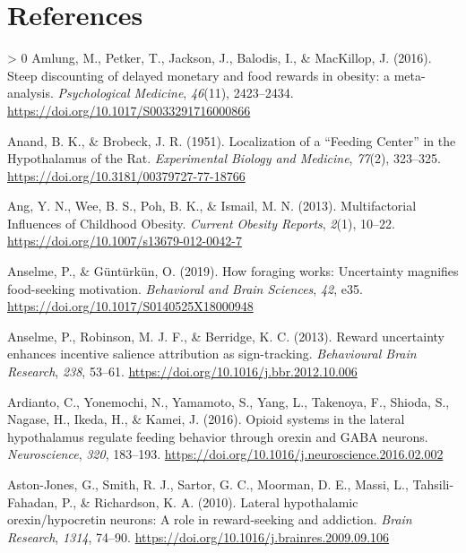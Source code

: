 \documentclass[
]{/home/nicoluarte/Downloads/templates/PNAS-template-main.tex}
\newlength{\cslhangindent}
\newenvironment{CSLReferences}[3] %
 {%
  \setlength{\parindent}{0pt}
  \ifodd #1 \everypar{\setlength{\hangindent}{\cslhangindent}}\ignorespaces\fi
  \ifnum #2 > 0
  \setlength{\parskip}{#2\baselineskip}
  \fi
 }%
 {}
\begin{document}
\newpage

\hypertarget{references}{%
\section{References}\label{references}}

\hypertarget{refs}{}
\begin{CSLReferences}{1}{0}
\leavevmode\hypertarget{ref-FCVQ7SB6}{}%
Amlung, M., Petker, T., Jackson, J., Balodis, I., \& MacKillop, J.
(2016). Steep discounting of delayed monetary and food rewards in
obesity: a meta-analysis. \emph{Psychological Medicine}, \emph{46}(11),
2423--2434. \url{https://doi.org/10.1017/S0033291716000866}

\leavevmode\hypertarget{ref-LJVQFQ6K}{}%
Anand, B. K., \& Brobeck, J. R. (1951). Localization of a {``Feeding
Center''} in the Hypothalamus of the Rat. \emph{Experimental Biology and
Medicine}, \emph{77}(2), 323--325.
\url{https://doi.org/10.3181/00379727-77-18766}

\leavevmode\hypertarget{ref-UQ9I8YFE}{}%
Ang, Y. N., Wee, B. S., Poh, B. K., \& Ismail, M. N. (2013).
Multifactorial Influences of Childhood Obesity. \emph{Current Obesity
Reports}, \emph{2}(1), 10--22.
\url{https://doi.org/10.1007/s13679-012-0042-7}

\leavevmode\hypertarget{ref-C6Z374UG}{}%
Anselme, P., \& Güntürkün, O. (2019). How foraging works: Uncertainty
magnifies food-seeking motivation. \emph{Behavioral and Brain Sciences},
\emph{42}, e35. \url{https://doi.org/10.1017/S0140525X18000948}

\leavevmode\hypertarget{ref-S8CHV5KG}{}%
Anselme, P., Robinson, M. J. F., \& Berridge, K. C. (2013). Reward
uncertainty enhances incentive salience attribution as sign-tracking.
\emph{Behavioural Brain Research}, \emph{238}, 53--61.
\url{https://doi.org/10.1016/j.bbr.2012.10.006}

\leavevmode\hypertarget{ref-QFWKWDA5}{}%
Ardianto, C., Yonemochi, N., Yamamoto, S., Yang, L., Takenoya, F.,
Shioda, S., Nagase, H., Ikeda, H., \& Kamei, J. (2016). Opioid systems
in the lateral hypothalamus regulate feeding behavior through orexin and
GABA neurons. \emph{Neuroscience}, \emph{320}, 183--193.
\url{https://doi.org/10.1016/j.neuroscience.2016.02.002}

\leavevmode\hypertarget{ref-9MIJEAWP}{}%
Aston-Jones, G., Smith, R. J., Sartor, G. C., Moorman, D. E., Massi, L.,
Tahsili-Fahadan, P., \& Richardson, K. A. (2010). Lateral hypothalamic
orexin/hypocretin neurons: A role in reward-seeking and addiction.
\emph{Brain Research}, \emph{1314}, 74--90.
\url{https://doi.org/10.1016/j.brainres.2009.09.106}


\end{CSLReferences}
\end{document}
